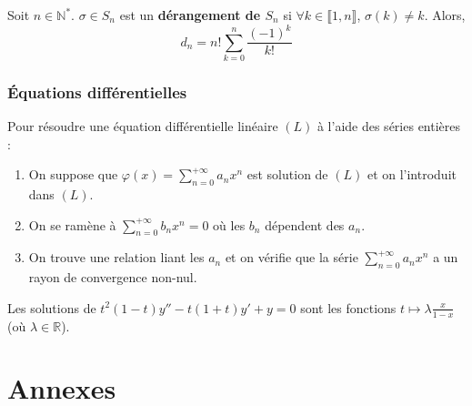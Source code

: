 
	\begin{application}
		Soit $n \in \mathbb{N}^*$. $\sigma \in S_n$ est un \textbf{dérangement de $S_n$} si $\forall k \in \llbracket 1, n \rrbracket$, $\sigma(k) \neq k$.
		Alors,
		\[ d_n = n! \sum_{k=0}^n \frac{(-1)^k}{k!} \]
	\end{application}

	\subsubsection{Équations différentielles}


	\begin{proposition}
		Pour résoudre une équation différentielle linéaire $(L)$ à l'aide des séries entières :
		\begin{enumerate}
			\item On suppose que $\varphi(x) = \sum_{n=0}^{+\infty} a_n x^n$ est solution de $(L)$ et on l'introduit dans $(L)$.
			\item On se ramène à $\sum_{n=0}^{+\infty} b_nx^n = 0$ où les $b_n$ dépendent des $a_n$.
			\item On trouve une relation liant les $a_n$ et on vérifie que la série $\sum_{n=0}^{+\infty} a_n x^n$ a un rayon de convergence non-nul.
		\end{enumerate}
	\end{proposition}


	\begin{example}
		Les solutions de $t^2 (1-t) y'' - t (1+t) y' + y = 0$ sont les fonctions $t \mapsto \lambda \frac{x}{1-x}$ (où $\lambda \in \mathbb{R}$).
	\end{example}

	\newpage
	\section*{Annexes}


